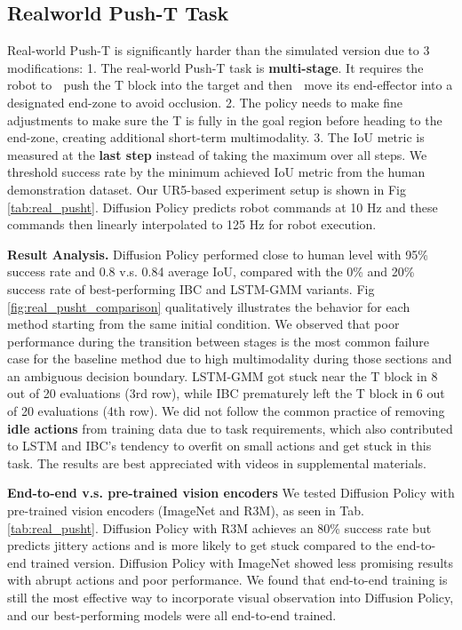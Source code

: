 \subsection{Realworld Push-T Task}

Real-world Push-T is significantly harder than the simulated version due to 3 modifications: 1. The real-world Push-T task is \textbf{multi-stage}. It requires the robot to \textcircled{} push the T block into the target and then \textcircled{} move its end-effector into a designated end-zone to avoid occlusion. 2. The policy needs to make fine adjustments to make sure the T is fully in the goal region before heading to the end-zone, creating additional short-term multimodality. 3. The IoU metric is measured at the \textbf{last step} instead of taking the maximum over all steps. We threshold success rate by the minimum achieved IoU metric from the human demonstration dataset. Our UR5-based experiment setup is shown in Fig \ref{tab:real_pusht}. Diffusion Policy predicts robot commands at 10 Hz and these commands then linearly interpolated to 125 Hz for robot execution.






\textbf{Result Analysis.}
Diffusion Policy performed close to human level with 95\% success rate and 0.8 v.s. 0.84 average IoU, compared with the 0\% and 20\% success rate of best-performing IBC and LSTM-GMM variants. Fig \ref{fig:real_pusht_comparison} qualitatively illustrates the behavior for each method starting from the same initial condition. 
We observed that poor performance during the transition between stages is the most common failure case for the baseline method due to high multimodality during those sections and an ambiguous decision boundary. LSTM-GMM got stuck near the T block in 8 out of 20 evaluations (3rd row), while IBC prematurely left the T block in 6 out of 20 evaluations (4th row). 
We did not follow the common practice of removing \textbf{idle actions} from training data due to task requirements, which also contributed to LSTM and IBC's tendency to overfit on small actions and get stuck in this task. The results are best appreciated with videos in supplemental materials.














\textbf{End-to-end v.s. pre-trained vision encoders}
We tested Diffusion Policy with pre-trained vision encoders (ImageNet \cite{deng2009imagenet} and R3M\cite{nair2022r3m}), as seen in Tab. \ref{tab:real_pusht}. Diffusion Policy with R3M achieves an 80\% success rate but predicts jittery actions and is more likely to get stuck compared to the end-to-end trained version. Diffusion Policy with ImageNet showed less promising results with abrupt actions and poor performance. We found that end-to-end training is still the most effective way to incorporate visual observation into Diffusion Policy, and our best-performing models were all end-to-end trained.





